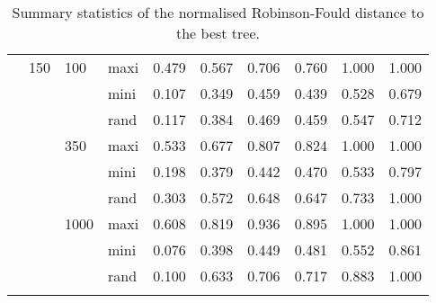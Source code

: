 \begin{longtable}{llllrrrrrr}
   & 150 & 100 & maxi & 0.479 & 0.567 & 0.706 & 0.760 & 1.000 & 1.000 \\ 
   &  &  & mini & 0.107 & 0.349 & 0.459 & 0.439 & 0.528 & 0.679 \\ 
   &  &  & rand & 0.117 & 0.384 & 0.469 & 0.459 & 0.547 & 0.712 \\ 
   &  & 350 & maxi & 0.533 & 0.677 & 0.807 & 0.824 & 1.000 & 1.000 \\ 
   &  &  & mini & 0.198 & 0.379 & 0.442 & 0.470 & 0.533 & 0.797 \\ 
   &  &  & rand & 0.303 & 0.572 & 0.648 & 0.647 & 0.733 & 1.000 \\ 
   &  & 1000 & maxi & 0.608 & 0.819 & 0.936 & 0.895 & 1.000 & 1.000 \\ 
   &  &  & mini & 0.076 & 0.398 & 0.449 & 0.481 & 0.552 & 0.861 \\ 
   &  &  & rand & 0.100 & 0.633 & 0.706 & 0.717 & 0.883 & 1.000 \\ 
   \hline
\hline
\caption{Summary statistics of the normalised Robinson-Fould distance to the best tree.} 
\label{Full_Tab_SummaryRFbest}
\end{longtable}

